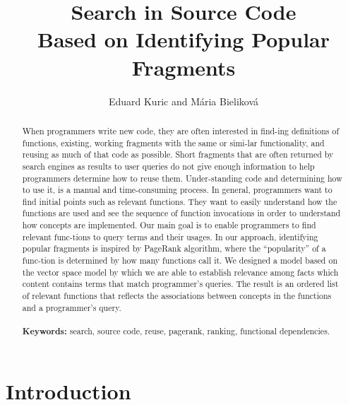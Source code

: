 \documentclass{llncs}
\begin{document}
 
\title{\textbf{Search in Source Code\\ Based on Identifying Popular Fragments}}

\author{Eduard Kuric and Mária Bieliková}

 
\maketitle            
 
\begin{abstract}
When programmers write new code, they are often interested in find-ing definitions of functions, existing, working fragments with the same or simi-lar functionality, and reusing as much of that code as possible. Short fragments that are often returned by search engines as results to user queries do not give enough information to help programmers determine how to reuse them. Under-standing code and determining how to use it, is a manual and time-consuming process. In general, programmers want to find initial points such as relevant functions. They want to easily understand how the functions are used and see the sequence of function invocations in order to understand how concepts are implemented. Our main goal is to enable programmers to find relevant func-tions to query terms and their usages. In our approach, identifying popular fragments is inspired by PageRank algorithm, where the “popularity” of a func-tion is determined by how many functions call it. We designed a model based on the vector space model by which we are able to establish relevance among facts which content contains terms that match programmer’s queries. The result is an ordered list of relevant functions that reflects the associations between concepts in the functions and a programmer’s query.\\ \\
\noindent \textbf{Keywords:} search, source code, reuse, pagerank, ranking, functional dependencies.
\end{abstract}

\section{Introduction}
\end{document}
